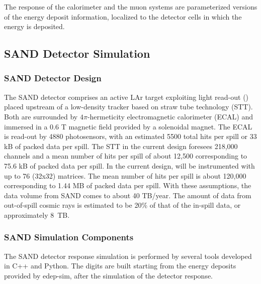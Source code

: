 \documentclass[../main-v1.tex]{subfiles}
\begin{document}
The response of the calorimeter and the muon systems are parameterized versions of the energy deposit information, localized to the detector cells in which the energy is deposited.

\subsection{SAND Detector Simulation}
\label{sec:usecases_sanddetesim}

\subsubsection{SAND Detector Design}
\label{sec:usecases_sanddetdesign}

The SAND detector comprises an active LAr target exploiting light read-out () placed upstream of a low-density tracker based on straw tube technology (STT). Both are surrounded by $4\pi$-hermeticity electromagnetic calorimeter (ECAL) and immersed in a 0.6 T magnetic field provided by a solenoidal magnet.
The ECAL is read-out by 4880 photosensors, with an estimated 5500 total hits per spill or 33 kB of packed data per spill. The STT in the current design foresees 218,000 channels and a mean number of hits per spill of about 12,500 corresponding to 75.6 kB of packed data per spill. In the current design,  will be instrumented with up to 76 (32x32)  matrices. The mean number of hits per spill is about 120,000 corresponding to 1.44 MB of packed data per spill. With these assumptions, the data volume from SAND comes to about 40 TB/year. The amount of data from out-of-spill cosmic rays is estimated to be 20\% of that of the in-spill data, or approximately 8~TB.

\subsubsection{SAND Simulation Components}
The SAND detector response simulation is performed by several tools developed in C++ and Python. The digits are built starting from the energy deposits provided by edep-sim, after the simulation of the detector response.
 
\end{document}
